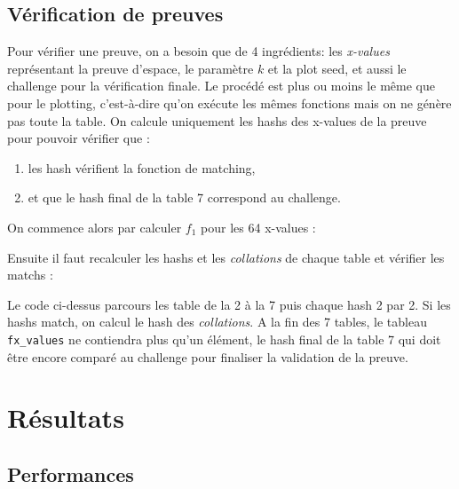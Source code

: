 \subsection{Vérification de preuves}

Pour vérifier une preuve, on a besoin que de 4 ingrédients: les \emph{x-values} représentant la preuve d'espace, le paramètre $k$ et la plot seed, et aussi le challenge pour la vérification finale. Le procédé est plus ou moins le même que pour le plotting, c'est-à-dire qu'on exécute les mêmes fonctions mais on ne génère pas toute la table. On calcule uniquement les hashs des x-values de la preuve pour pouvoir vérifier que :

\begin{enumerate}
  \item les hash vérifient la fonction de matching,
  \item et que le hash final de la table 7 correspond au challenge.
\end{enumerate}

On commence alors par calculer $f_1$ pour les 64 x-values :


\newpage

Ensuite il faut recalculer les hashs et les \emph{collations} de chaque table et vérifier les matchs :


Le code ci-dessus parcours les table de la 2 à la 7 puis chaque hash 2 par 2. Si les hashs match, on calcul le hash des \emph{collations}. A la fin des 7 tables, le tableau \verb|fx_values| ne contiendra plus qu'un élément, le hash final de la table 7 qui doit être encore comparé au challenge pour finaliser la validation de la preuve. 

\section{Résultats}

\lipsum[1]

\subsection{Performances}

